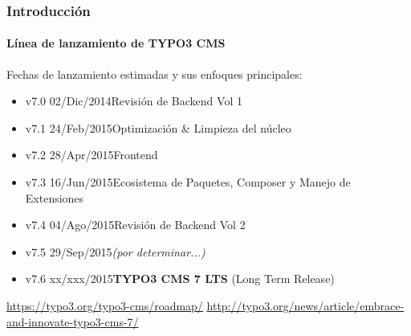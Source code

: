 \begin{frame}[fragile]
	\frametitle{Introducción}
	\framesubtitle{Línea de lanzamiento de TYPO3 CMS}

	Fechas de lanzamiento estimadas y sus enfoques principales:

	\begin{itemize}
		\item v7.0 \tabto{1.0cm}02/Dic/2014\tabto{3.4cm}Revisión de Backend Vol 1
		\item v7.1 \tabto{1.0cm}24/Feb/2015\tabto{3.4cm}Optimización \& Limpieza del núcleo
		\item v7.2 \tabto{1.0cm}28/Apr/2015\tabto{3.4cm}Frontend
		\item v7.3 \tabto{1.0cm}16/Jun/2015\tabto{3.4cm}Ecosistema de Paquetes, Composer\newline
			\tabto{3.4cm}y Manejo de Extensiones
		\item
			\begingroup
				\color{typo3orange}
					v7.4 \tabto{1.0cm}04/Ago/2015\tabto{3.4cm}Revisión de Backend Vol 2
			\endgroup

		\item v7.5 \tabto{1.0cm}29/Sep/2015\tabto{3.4cm}\textit{(por determinar...)}
		\item v7.6 \tabto{1.0cm}xx/xxx/2015\tabto{3.4cm}\textbf{TYPO3 CMS 7 LTS} (Long Term Release)
	\end{itemize}

	\smaller
		\url{https://typo3.org/typo3-cms/roadmap/}\newline
		\url{http://typo3.org/news/article/embrace-and-innovate-typo3-cms-7/}
	\normalsize

\end{frame}

